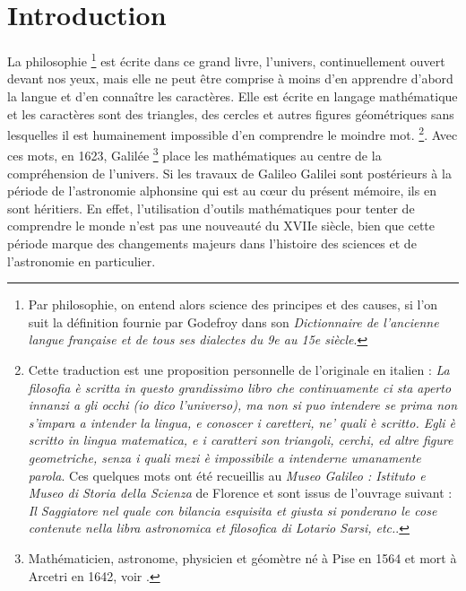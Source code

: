 \chapter{Introduction}

\og{}La philosophie \footnote{Par philosophie, on entend alors science des principes et des causes, si l'on suit la définition fournie par Godefroy dans son \textit{Dictionnaire de l'ancienne langue française et de tous ses dialectes du 9e au 15e siècle}.} est écrite dans ce grand livre, l'univers, continuellement ouvert devant nos yeux, mais elle ne peut être comprise à moins d'en apprendre d'abord la langue et d'en connaître les caractères. Elle est écrite en langage mathématique et les caractères sont des triangles, des cercles et autres figures géométriques sans lesquelles il est humainement impossible d'en comprendre le moindre mot. \fg{}\footnote{Cette traduction est une proposition personnelle de l'originale en italien : \og{}\textit{La filosofia è scritta in questo grandissimo libro che continuamente ci sta aperto innanzi a gli occhi (io dico l'universo), ma non si puo intendere se prima non s'impara a intender la lingua, e conoscer i caretteri, ne' quali è scritto. Egli è scritto in lingua matematica, e i caratteri son triangoli, cerchi, ed altre figure geometriche, senza i quali mezi è impossibile a intenderne umanamente parola}. \fg{} Ces quelques mots ont été recueillis au \textit{Museo Galileo : Istituto e Museo di Storia della Scienza} de Florence et sont issus de l'ouvrage suivant : \textit{Il Saggiatore nel quale con bilancia esquisita et giusta si ponderano le cose contenute nella libra astronomica et filosofica di Lotario Sarsi, etc.}.}. Avec ces mots, en 1623, Galilée \footnote{{Mathématicien, astronome, physicien et géomètre né à Pise en 1564 et mort à Arcetri en 1642, voir} \cite{baldiniGalileoGalilei1998}.} place les mathématiques au centre de la compréhension de l'univers. Si les travaux de Galileo Galilei sont postérieurs à la période de l'astronomie alphonsine qui est au cœur du présent mémoire, ils en sont héritiers. En effet, l'utilisation d'outils mathématiques pour tenter de comprendre le monde n'est pas une nouveauté du XVIIe siècle, bien que cette période marque des changements majeurs dans l'histoire des sciences et de l'astronomie en particulier. 

